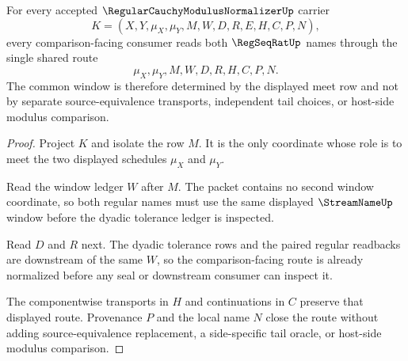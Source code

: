 \begin{theorem}
\label{thm:regular-cauchy-modulus-normalizer-common-window}
For every accepted $\RegularCauchyModulusNormalizerUp$ carrier
$$
K=(X,Y,\mu_X,\mu_Y,M,W,D,R,E,H,C,P,N),
$$
every comparison-facing consumer reads both $\RegSeqRatUp$ names through the single shared route
$$
\mu_X,\mu_Y,M,W,D,R,H,C,P,N.
$$
The common window is therefore determined by the displayed meet row and not by separate source-equivalence transports, independent tail choices, or host-side modulus comparison.
\end{theorem}
\begin{proof}
Project $K$ and isolate the row $M$. It is the only coordinate whose role is to meet the two displayed schedules $\mu_X$ and $\mu_Y$.

Read the window ledger $W$ after $M$. The packet contains no second window coordinate, so both regular names must use the same displayed $\StreamNameUp$ window before the dyadic tolerance ledger is inspected.

Read $D$ and $R$ next. The dyadic tolerance rows and the paired regular readbacks are downstream of the same $W$, so the comparison-facing route is already normalized before any seal or downstream consumer can inspect it.

The componentwise transports in $H$ and continuations in $C$ preserve that displayed route. Provenance $P$ and the local name $N$ close the route without adding source-equivalence replacement, a side-specific tail oracle, or host-side modulus comparison.
\end{proof}


